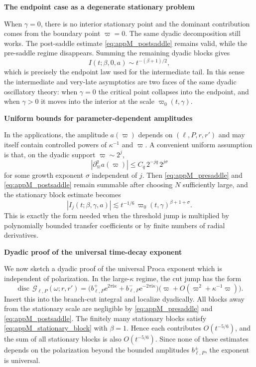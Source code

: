 \documentclass[12pt]{article}
\numberwithin{equation}{section}
\theoremstyle{plain}
\theoremstyle{definition}
\theoremstyle{remark}
\newcommand{\ii}{\mathrm i}
\newcommand{\ee}{\mathrm e}
\newcommand{\disc}{\operatorname{disc}}
\newcommand{\cG}{\mathcal G}
\newcommand{\om}{\omega}
\newcommand{\vp}{\varpi}
\newcommand{\kap}{\kappa}
\newcommand{\abs}[1]{\left|#1\right|}
\newcommand{\appheading}[1]{\par\medskip\noindent\textbf{#1}\par\smallskip\noindent}
\begin{document}
\appheading{The endpoint case as a degenerate stationary problem}

When $\gamma=0$, there is no interior stationary point and the dominant contribution comes from the boundary point $\vp=0$.  The same dyadic decomposition still works.  The post-saddle estimate \eqref{eq:appM_postsaddle} remains valid, while the pre-saddle regime disappears.  Summing the remaining dyadic blocks gives
\[
   I(t;\beta,0,a)
   \sim
   t^{-(\beta+1)/2},
\]
which is precisely the endpoint law used for the intermediate tail.  In this sense the intermediate and very-late asymptotics are two faces of the same dyadic oscillatory theory: when $\gamma=0$ the critical point collapses into the endpoint, and when $\gamma>0$ it moves into the interior at the scale $\vp_0(t,\gamma)$.

\appheading{Uniform bounds for parameter-dependent amplitudes}

In the applications, the amplitude $a(\vp)$ depends on $(\ell,P,r,r')$ and may itself contain controlled powers of $\kap^{-1}$ and $\vp$.  A convenient uniform assumption is that, on the dyadic support $\vp\sim2^j$,
\begin{equation}\label{eq:appM_amp_assumption}
   \abs{\partial_\vp^q a(\vp)}
   \le
   C_q\,2^{-jq}\,2^{j\sigma}
\end{equation}
for some growth exponent $\sigma$ independent of $j$.  Then \eqref{eq:appM_presaddle} and \eqref{eq:appM_postsaddle} remain summable after choosing $N$ sufficiently large, and the stationary block estimate becomes
\[
   \abs{I_j(t;\beta,\gamma,a)}
   \lesssim
   t^{-1/6}\,\vp_0(t,\gamma)^{\beta+1+\sigma}.
\]
This is exactly the form needed when the threshold jump is multiplied by polynomially bounded transfer coefficients or by finite numbers of radial derivatives.

\appheading{Dyadic proof of the universal time-decay exponent}

We now sketch a dyadic proof of the universal Proca exponent which is independent of polarization.  In the large-$\kap$ regime, the cut jump has the form
\[
   \disc\,\cG_{\ell,P}(\om;r,r')
   =
   \bigl(b_{\ell,P}^+\ee^{2\pi\ii\kap}+b_{\ell,P}^-\ee^{-2\pi\ii\kap}\bigr)
   \bigl(\vp+O(\vp^2+\kap^{-1}\vp)\bigr).
\]
Insert this into the branch-cut integral and localize dyadically.  All blocks away from the stationary scale are negligible by \eqref{eq:appM_presaddle} and \eqref{eq:appM_postsaddle}.  The finitely many stationary blocks satisfy \eqref{eq:appM_stationary_block} with $\beta=1$.  Hence each contributes $O(t^{-5/6})$, and the sum of all stationary blocks is also $O(t^{-5/6})$.  Since none of these estimates depends on the polarization beyond the bounded amplitudes $b_{\ell,P}^\pm$, the exponent is universal.
\end{document}
